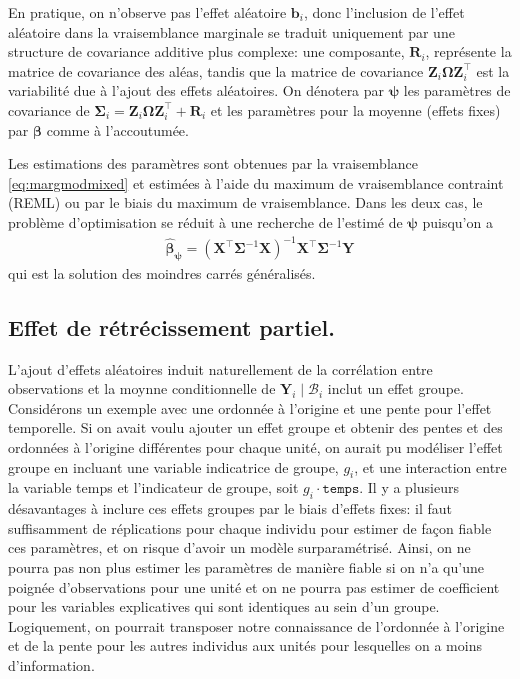\documentclass[
  11pt,
  letterpaper,
]{article}
\theoremstyle{definition}
\theoremstyle{definition}
\theoremstyle{definition}
\theoremstyle{definition}
\theoremstyle{remark}
\begin{document}
En pratique, on n'observe pas l'effet aléatoire \(\boldsymbol{b}_i\), donc l'inclusion de l'effet aléatoire dans la vraisemblance marginale se traduit uniquement par une structure de covariance additive plus complexe: une composante, \(\mathbf{R}_i\), représente la matrice de covariance des aléas, tandis que la matrice de covariance \(\mathbf{Z}_i\boldsymbol{\Omega}\mathbf{Z}_i^\top\) est la variabilité due à l'ajout des effets aléatoires. On dénotera par \(\boldsymbol{\psi}\) les paramètres de covariance de \(\boldsymbol{\Sigma}_i= \mathbf{Z}_i\boldsymbol{\Omega}\mathbf{Z}_i^\top + \mathbf{R}_i\) et les paramètres pour la moyenne (effets fixes) par \(\boldsymbol{\beta}\) comme à l'accoutumée.

Les estimations des paramètres sont obtenues par la vraisemblance \eqref{eq:margmodmixed} et estimées à l'aide du maximum de vraisemblance contraint (REML) ou par le biais du maximum de vraisemblance. Dans les deux cas, le problème d'optimisation se réduit à une recherche de l'estimé de \(\boldsymbol{\psi}\) puisqu'on a
\begin{align*}
\widehat{\boldsymbol{\beta}}_{\boldsymbol{\psi}} = (\mathbf{X}^\top\boldsymbol{\Sigma}^{-1}\mathbf{X})^{-1}\mathbf{X}^\top\boldsymbol{\Sigma}^{-1}\boldsymbol{Y}
\end{align*}
qui est la solution des moindres carrés généralisés.

\hypertarget{effet-de-ruxe9truxe9cissement-partiel.}{%
\subsection{Effet de rétrécissement partiel.}\label{effet-de-ruxe9truxe9cissement-partiel.}}

L'ajout d'effets aléatoires induit naturellement de la corrélation entre observations et la moynne conditionnelle de \(\boldsymbol{Y}_i \mid \mathcal{B}_i\) inclut un effet groupe. Considérons un exemple avec une ordonnée à l'origine et une pente pour l'effet temporelle. Si on avait voulu ajouter un effet groupe et obtenir des pentes et des ordonnées à l'origine différentes pour chaque unité, on aurait pu modéliser l'effet groupe en incluant une variable indicatrice de groupe, \(g_i\), et une interaction entre la variable temps et l'indicateur de groupe, soit \(g_i\cdot \texttt{temps}\). Il y a plusieurs désavantages à inclure ces effets groupes par le biais d'effets fixes: il faut suffisamment de réplications pour chaque individu pour estimer de façon fiable ces paramètres, et on risque d'avoir un modèle surparamétrisé. Ainsi, on ne pourra pas non plus estimer les paramètres de manière fiable si on n'a qu'une poignée d'observations pour une unité et on ne pourra pas estimer de coefficient pour les variables explicatives qui sont identiques au sein d'un groupe. Logiquement, on pourrait transposer notre connaissance de l'ordonnée à l'origine et de la pente pour les autres individus aux unités pour lesquelles on a moins d'information.
\end{document}
